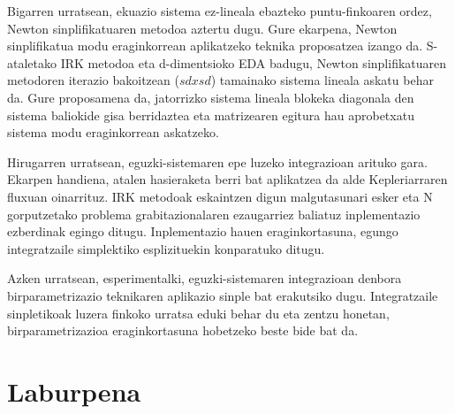 Bigarren urratsean, ekuazio sistema ez-lineala ebazteko puntu-finkoaren ordez, Newton sinplifikatuaren metodoa aztertu dugu. Gure ekarpena, Newton sinplifikatua modu eraginkorrean aplikatzeko teknika proposatzea izango da. S-ataletako IRK metodoa eta d-dimentsioko EDA badugu, Newton sinplifikatuaren metodoren iterazio bakoitzean ($sdxsd$) tamainako sistema lineala askatu behar da. Gure proposamena da, jatorrizko sistema lineala blokeka diagonala den sistema baliokide gisa berridaztea eta matrizearen egitura hau aprobetxatu sistema modu eraginkorrean askatzeko.

Hirugarren urratsean, eguzki-sistemaren epe luzeko integrazioan arituko gara. Ekarpen handiena, atalen hasieraketa berri bat aplikatzea da alde Kepleriarraren fluxuan oinarrituz. IRK metodoak eskaintzen digun malgutasunari esker eta N gorputzetako problema grabitazionalaren ezaugarriez baliatuz inplementazio ezberdinak egingo ditugu. Inplementazio hauen eraginkortasuna, egungo integratzaile simplektiko esplizituekin konparatuko ditugu.

Azken urratsean, esperimentalki, eguzki-sistemaren integrazioan  denbora birparametrizazio teknikaren aplikazio sinple bat erakutsiko dugu. Integratzaile sinpletikoak luzera finkoko urratsa eduki behar du eta zentzu honetan, birparametrizazioa eraginkortasuna hobetzeko beste bide bat da.             
      
\section{Laburpena}

